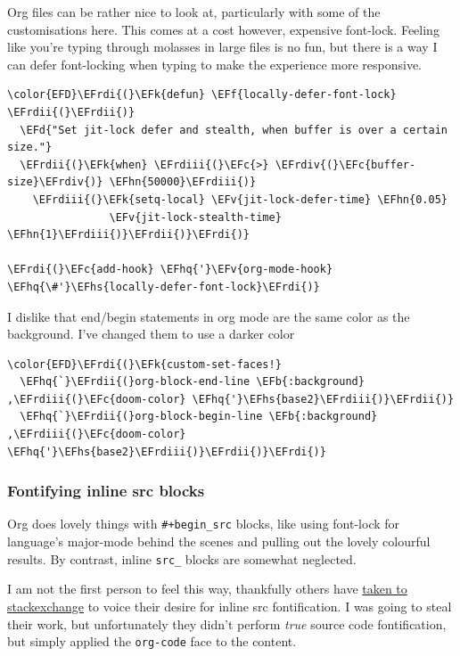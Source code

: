 \documentclass{scrartcl}
\newcommand{\EFk}[1]{\textcolor{EFk}{#1}} %
\newcommand{\EFd}[1]{\textcolor{EFd}{#1}} %
\newcommand{\EFb}[1]{\textcolor{EFb}{#1}} %
\newcommand{\EFc}[1]{\textcolor{EFc}{#1}} %
\newcommand{\EFv}[1]{\textcolor{EFv}{#1}} %
\newcommand{\EFf}[1]{\textcolor{EFf}{#1}} %
\newcommand{\EFhn}[1]{#1} %
\newcommand{\EFhq}[1]{#1} %
\newcommand{\EFhs}[1]{#1} %
\newcommand{\EFrdi}[1]{#1} %
\newcommand{\EFrdii}[1]{#1} %
\newcommand{\EFrdiii}[1]{#1} %
\newcommand{\EFrdiv}[1]{#1} %
\begin{document}
Org files can be rather nice to look at, particularly with some of the
customisations here. This comes at a cost however, expensive font-lock.
Feeling like you're typing through molasses in large files is no fun, but there
is a way I can defer font-locking when typing to make the experience more
responsive.
\begin{Code}
\begin{Verbatim}[]
\color{EFD}\EFrdi{(}\EFk{defun} \EFf{locally-defer-font-lock} \EFrdii{(}\EFrdii{)}
  \EFd{"Set jit-lock defer and stealth, when buffer is over a certain size."}
  \EFrdii{(}\EFk{when} \EFrdiii{(}\EFc{>} \EFrdiv{(}\EFc{buffer-size}\EFrdiv{)} \EFhn{50000}\EFrdiii{)}
    \EFrdiii{(}\EFk{setq-local} \EFv{jit-lock-defer-time} \EFhn{0.05}
                \EFv{jit-lock-stealth-time} \EFhn{1}\EFrdiii{)}\EFrdii{)}\EFrdi{)}

\EFrdi{(}\EFc{add-hook} \EFhq{'}\EFv{org-mode-hook} \EFhq{\#'}\EFhs{locally-defer-font-lock}\EFrdi{)}
\end{Verbatim}
\end{Code}

I dislike that end/begin statements in org mode are the same color as the
background. I've changed them to use a darker color
\begin{Code}
\begin{Verbatim}[]
\color{EFD}\EFrdi{(}\EFk{custom-set-faces!}
  \EFhq{`}\EFrdii{(}org-block-end-line \EFb{:background} ,\EFrdiii{(}\EFc{doom-color} \EFhq{'}\EFhs{base2}\EFrdiii{)}\EFrdii{)}
  \EFhq{`}\EFrdii{(}org-block-begin-line \EFb{:background} ,\EFrdiii{(}\EFc{doom-color} \EFhq{'}\EFhs{base2}\EFrdiii{)}\EFrdii{)}\EFrdi{)}
\end{Verbatim}
\end{Code}

\subsubsection{Fontifying inline src blocks}
\label{sec:orgdbbd129}
Org does lovely things with \texttt{\#+begin\_src} blocks, like using font-lock for
language's major-mode behind the scenes and pulling out the lovely colourful
results. By contrast, inline \texttt{src\_} blocks are somewhat neglected.

I am not the first person to feel this way, thankfully others have \href{https://stackoverflow.com/questions/20309842/how-to-syntax-highlight-for-org-mode-inline-source-code-src-lang/28059832}{taken to
stackexchange} to voice their desire for inline src fontification. I was going to
steal their work, but unfortunately they didn't perform \emph{true} source code
fontification, but simply applied the \texttt{org-code} face to the content.
\end{document}
